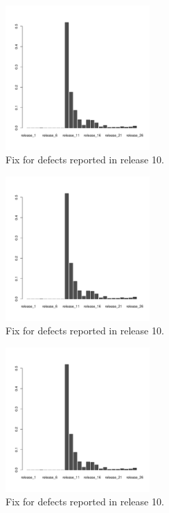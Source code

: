 \begin{figure}[thb!]
      \caption{Fix for defects reported in release 10.}
      \label{fig:defect_release_10}
      \includegraphics[width=0.49\textwidth]{figures/r10}
\end{figure}

\begin{figure}[thb!]
      \caption{Fix for defects reported in release 10.}
      \label{fig:defect_release_10}
      \includegraphics[width=0.49\textwidth]{figures/r10}
\end{figure}

\begin{figure}[thb!]
      \caption{Fix for defects reported in release 10.}
      \label{fig:defect_release_10}
      \includegraphics[width=0.49\textwidth]{figures/r10}
\end{figure}


